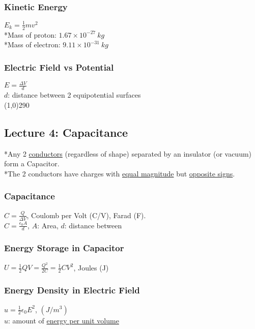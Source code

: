 \documentclass[10 pt]{article}
\begin{document}
\begin{multicols}{2}
\subsubsection*{Kinetic Energy}
$E_{k} = \frac{1}{2}mv^{2}$ \\
\normalsize
*Mass of proton: $1.67 \times 10^{-27}~kg$ \\
*Mass of electron: $9.11 \times 10^{-31}~kg$

\subsubsection*{Electric Field vs Potential}
$E = \frac{\Delta V}{d}$ \\
\normalsize
$d$: distance between 2 equipotential surfaces
\\
\line(1,0){290}
\subsection*{Lecture 4: Capacitance}
*Any 2 \underline{conductors} (regardless of shape) separated by an insulator (or vacuum) form a Capacitor. \\
*The 2 conductors have charges with \underline{equal magnitude} but \underline{opposite signs}.
\subsubsection*{Capacitance}
$C = \frac{Q}{\Delta V}$, Coulomb per Volt (C/V), Farad (F). \\
$C = \frac{\epsilon_{0}A}{d}$, $A$: Area, $d$: distance between

\subsubsection*{Energy Storage in Capacitor}
$U = \frac{1}{2}QV = \frac{Q^{2}}{2C} = \frac{1}{2}CV^{2}$\normalsize, Joules (J)

\subsubsection*{Energy Density in Electric Field}
$u = \frac{1}{2}\epsilon_{0}E^{2}$, $(J/m^{3})$ \\
$u$: amount of \underline{energy per unit volume}


\end{multicols}
\end{document}
